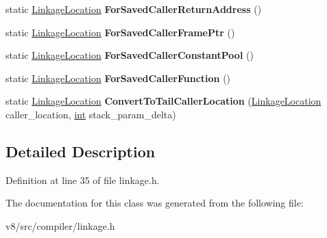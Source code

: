 \begin{DoxyCompactItemize}
static \mbox{\hyperlink{classv8_1_1internal_1_1compiler_1_1LinkageLocation}{Linkage\+Location}} {\bfseries For\+Saved\+Caller\+Return\+Address} ()
\item 
\mbox{\label{classv8_1_1internal_1_1compiler_1_1LinkageLocation_ac8f31328d9dd27075d7b60be33db860a}} 
static \mbox{\hyperlink{classv8_1_1internal_1_1compiler_1_1LinkageLocation}{Linkage\+Location}} {\bfseries For\+Saved\+Caller\+Frame\+Ptr} ()
\item 
\mbox{\label{classv8_1_1internal_1_1compiler_1_1LinkageLocation_a6930e2b0222b435bd52cd9c4ad081c67}} 
static \mbox{\hyperlink{classv8_1_1internal_1_1compiler_1_1LinkageLocation}{Linkage\+Location}} {\bfseries For\+Saved\+Caller\+Constant\+Pool} ()
\item 
\mbox{\label{classv8_1_1internal_1_1compiler_1_1LinkageLocation_a4b140765a5213e683a9f9c81f2a44a3d}} 
static \mbox{\hyperlink{classv8_1_1internal_1_1compiler_1_1LinkageLocation}{Linkage\+Location}} {\bfseries For\+Saved\+Caller\+Function} ()
\item 
\mbox{\label{classv8_1_1internal_1_1compiler_1_1LinkageLocation_aa7d35e0c3037ce3e6f41b0997f42a918}} 
static \mbox{\hyperlink{classv8_1_1internal_1_1compiler_1_1LinkageLocation}{Linkage\+Location}} {\bfseries Convert\+To\+Tail\+Caller\+Location} (\mbox{\hyperlink{classv8_1_1internal_1_1compiler_1_1LinkageLocation}{Linkage\+Location}} caller\+\_\+location, \mbox{\hyperlink{classint}{int}} stack\+\_\+param\+\_\+delta)
\end{DoxyCompactItemize}


\subsection{Detailed Description}


Definition at line 35 of file linkage.\+h.



The documentation for this class was generated from the following file\+:\begin{DoxyCompactItemize}
\item 
v8/src/compiler/linkage.\+h\end{DoxyCompactItemize}
